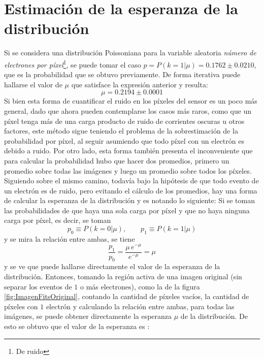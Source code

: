\section{Estimación de la esperanza de la distribución}
\noindent Si se considera una distribución Poissoniana para la variable aleatoria \textit{número de electrones por píxel}\footnote{De ruido}, se puede tomar el caso $p = P(k = 1 | \mu) = 0.1762 \pm 0.0210$, que es la probabilidad que se obtuvo previamente. De forma iterativa puede hallarse el valor de $\mu$ que satisface la expresión anterior y resulta:
\begin{equation*}
    \mu = 0.2194 \pm 0.0001
\end{equation*}
Si bien esta forma de cuantificar el ruido en los píxeles del sensor es un poco más general, dado que ahora pueden contemplarse los casos más raros, como que un píxel tenga más de una carga producto de ruido de corrientes oscuras u otros factores, este método sigue teniendo el problema de la sobrestimación de la probabilidad por píxel, al seguir asumiendo que todo píxel con un electrón es debido a ruido. Por otro lado, esta forma también presenta el inconveniente que para calcular la probabilidad hubo que hacer dos promedios, primero un promedio sobre todas las imágenes y luego un promedio sobre todos los píxeles.\\
\indent Siguiendo sobre el mismo camino, todavía bajo la hipótesis de que todo evento de un electrón es de ruido, pero evitando el cálculo de los promedios, hay una forma de calcular la esperanza de la distribución y es notando lo siguiente: Si se toman las probabilidades de que haya una sola carga por píxel y que no haya ninguna carga por píxel, es decir, se toman
\begin{equation*}
    p_{0} \equiv P(k = 0 | \mu),
    \quad
    \quad
    p_{1} \equiv P(k = 1 | \mu)
\end{equation*}
y se mira la relación entre ambas, se tiene
\begin{equation*}
    \frac{p_{1}}{p_{0}} = \frac{\mu\,e^{-\mu}}{e^{-\mu}} = \mu
\end{equation*}
y se ve que puede hallarse directamente el valor de la esperanza de la distribución. Entonces, tomando la región activa de una imagen original (sin separar los eventos de $1$ o más electrones), como la de la figura \ref{fig:ImagenFitsOriginal}, contando la cantidad de píxeles vacíos, la cantidad de píxeles con $1$ electrón y calculando la relación entre ambas, para todas las imágenes, se puede obtener directamente la esperanza $\mu$ de la distribución. De esto se obtuvo que el valor de la esperanza es :
